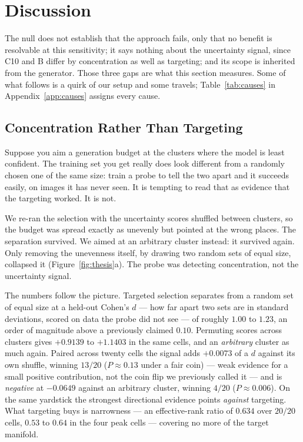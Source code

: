 \documentclass{article} %
\begin{document}
\section{Discussion}
\label{sec:dissection}

The null does not establish that the approach fails, only that no benefit is resolvable at this
sensitivity; it says nothing about the uncertainty signal, since C10 and B differ by concentration
as well as targeting; and its scope is inherited from the generator. Those three gaps are what this section measures. Some of what follows is a quirk of our setup and
some travels; Table~\ref{tab:causes} in Appendix~\ref{app:causes} assigns every cause.

\subsection{Concentration Rather Than Targeting}
\label{sec:diss-signal}

Suppose you aim a generation budget at the clusters where the model is least confident. The training
set you get really does look different from a randomly chosen one of the same size: train a probe to
tell the two apart and it succeeds easily, on images it has never seen. It is tempting to read that
as evidence that the targeting worked. It is not.

We re-ran the selection with the uncertainty scores shuffled between clusters, so the budget was
spread exactly as unevenly but pointed at the wrong places. The separation survived. We aimed at an
arbitrary cluster instead: it survived again. Only removing the unevenness itself, by drawing two
random sets of equal size, collapsed it (Figure~\ref{fig:thesis}a). The probe was detecting
concentration, not the uncertainty signal.

The numbers follow the picture. Targeted selection separates from a random set of equal size at a
held-out Cohen's $d$ --- how far apart two sets are in standard deviations, scored on data the probe
did not see --- of roughly $1.00$ to $1.23$, an order of magnitude above a previously claimed
$0.10$. Permuting scores across clusters gives $+0.9139$ to $+1.1403$ in the same cells, and an
\emph{arbitrary} cluster as much again. Paired across twenty cells the signal adds $+0.0073$ of a
$d$ against its own shuffle, winning $13/20$ ($P \approx 0.13$ under a fair coin) --- weak evidence
for a small positive contribution, not the coin flip we previously called it --- and is
\emph{negative} at $-0.0649$ against an arbitrary cluster, winning $4/20$ ($P \approx 0.006$). On the
same yardstick the strongest directional evidence points \emph{against} targeting. What targeting
buys is narrowness --- an effective-rank ratio of $0.634$ over $20/20$ cells, $0.53$ to $0.64$ in
the four peak cells --- covering no more of the target manifold.
\end{document}
